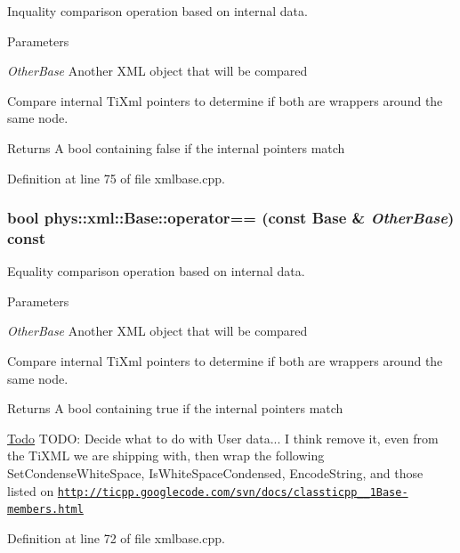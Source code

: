 Inquality comparison operation based on internal data. 


\begin{DoxyParams}{Parameters}
\item[{\em OtherBase}]Another XML object that will be compared\end{DoxyParams}
Compare internal TiXml pointers to determine if both are wrappers around the same node. \begin{DoxyReturn}{Returns}
A bool containing false if the internal pointers match 
\end{DoxyReturn}


Definition at line 75 of file xmlbase.cpp.

\hypertarget{classphys_1_1xml_1_1Base_af5412e64fd83a5193e28a20df462b9a6}{
\subsubsection[{operator==}]{\setlength{\rightskip}{0pt plus 5cm}bool phys::xml::Base::operator== (const {\bf Base} \& {\em OtherBase}) const}}
\label{df/d10/classphys_1_1xml_1_1Base_af5412e64fd83a5193e28a20df462b9a6}


Equality comparison operation based on internal data. 


\begin{DoxyParams}{Parameters}
\item[{\em OtherBase}]Another XML object that will be compared\end{DoxyParams}
Compare internal TiXml pointers to determine if both are wrappers around the same node. \begin{DoxyReturn}{Returns}
A bool containing true if the internal pointers match
\end{DoxyReturn}
\begin{Desc}
\item[\hyperlink{todo__todo000032}{Todo}]TODO: Decide what to do with User data... I think remove it, even from the TiXML we are shipping with, then wrap the following SetCondenseWhiteSpace, IsWhiteSpaceCondensed, EncodeString, and those listed on \href{http://ticpp.googlecode.com/svn/docs/classticpp_1_1Base-members.html}{\tt http://ticpp.googlecode.com/svn/docs/classticpp\_\_\-1Base-\/members.html} \end{Desc}


Definition at line 72 of file xmlbase.cpp.

